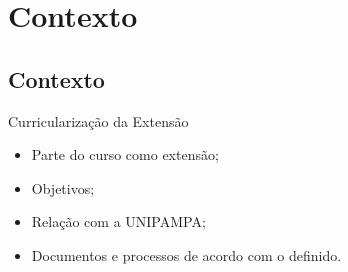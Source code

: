 \section{Contexto}
\subsection*{Contexto}

\begin{frame}{{\sffamily Curricularização da Extensão}}
\begin{block}{}
    \begin{itemize}
        \item Parte do curso como extensão; %
        \item Objetivos; %
        \item Relação com a UNIPAMPA; %
        \item Documentos e processos de acordo com o definido. %
    \end{itemize}
\end{block}
\end{frame}

